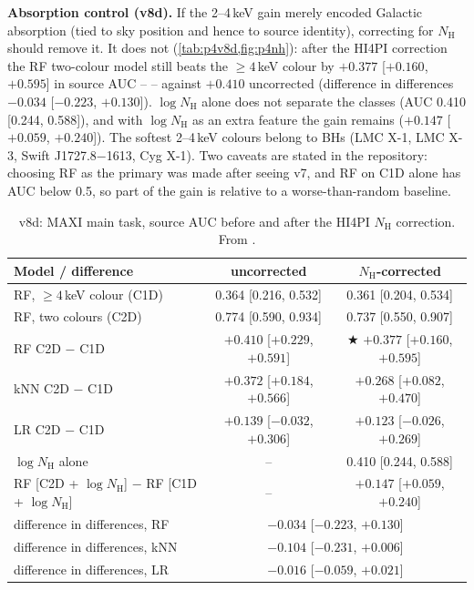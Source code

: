 \Primary{} \textbf{Absorption control (v8d).} If the 2--4\,keV gain merely encoded Galactic absorption (tied to sky position and
hence to source identity), correcting for $N_\mathrm{H}$ should remove it. It does not (\cref{tab:p4v8d,fig:p4nh}): after the
HI4PI correction the RF two-colour model still beats the $\ge4$\,keV colour by $+0.377$ [$+0.160$, $+0.595$] in source AUC --
\Detected{} -- against $+0.410$ uncorrected (difference in differences $-0.034$ [$-0.223$, $+0.130$]). $\log N_\mathrm{H}$ alone does
not separate the classes (AUC 0.410 [0.244, 0.588]), and with $\log N_\mathrm{H}$ as an extra feature the gain remains
($+0.147$ [$+0.059$, $+0.240$]). The softest 2--4\,keV colours belong to BHs (LMC X-1, LMC X-3, Swift J1727.8$-$1613, Cyg X-1). Two
caveats are stated in the repository: choosing RF as the primary was made after seeing v7, and RF on C1D alone has AUC below 0.5,
so part of the gain is relative to a worse-than-random baseline.

\begin{table}[htbp]
\centering\small
\caption[MAXI after N\_H correction]{\Primary{} v8d: MAXI main task, source AUC before and after the HI4PI $N_\mathrm{H}$
correction. From .}
\label{tab:p4v8d}
\footnotesize
\begin{tabular}{@{}lcc@{}}
\toprule
Model / difference & uncorrected & $N_\mathrm{H}$-corrected \\
\midrule
RF, $\ge4$\,keV colour (C1D) & 0.364 [0.216, 0.532] & 0.361 [0.204, 0.534] \\
RF, two colours (C2D) & 0.774 [0.590, 0.934] & 0.737 [0.550, 0.907] \\
RF C2D $-$ C1D & $+0.410$ [$+0.229$, $+0.591$] & $\bigstar$ $+0.377$ [$+0.160$, $+0.595$] \\
kNN C2D $-$ C1D & $+0.372$ [$+0.184$, $+0.566$] & $+0.268$ [$+0.082$, $+0.470$] \\
LR C2D $-$ C1D & $+0.139$ [$-0.032$, $+0.306$] & $+0.123$ [$-0.026$, $+0.269$] \\
$\log N_\mathrm{H}$ alone & -- & 0.410 [0.244, 0.588] \\
RF [C2D + $\log N_\mathrm{H}$] $-$ RF [C1D + $\log N_\mathrm{H}$] & -- & $+0.147$ [$+0.059$, $+0.240$] \\
difference in differences, RF & \multicolumn{2}{c}{$-0.034$ [$-0.223$, $+0.130$]} \\
difference in differences, kNN & \multicolumn{2}{c}{$-0.104$ [$-0.231$, $+0.006$]} \\
difference in differences, LR & \multicolumn{2}{c}{$-0.016$ [$-0.059$, $+0.021$]} \\
\bottomrule
\end{tabular}
\end{table}

